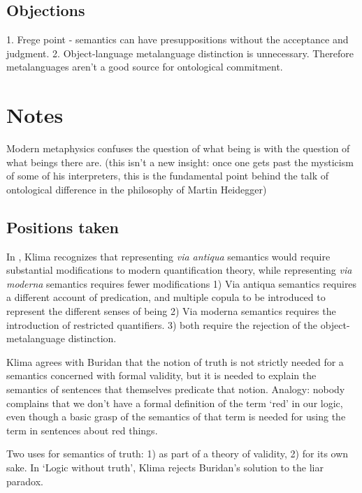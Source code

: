 \documentclass[]{article}
\begin{document}
\subsection{Objections}
1. Frege point - semantics can have presuppositions without the acceptance and judgment. 
2. Object-language metalanguage distinction is unnecessary. Therefore metalanguages aren't a good source for ontological commitment. 
\section{Notes}
Modern metaphysics confuses the question of what being is with the question of what beings there are. (this isn't a new insight: once one gets past the mysticism of some of his interpreters, this is the fundamental point behind the talk of ontological difference in the philosophy of Martin Heidegger)
\subsection{Positions taken}
In \autocite{Klima2008a}, Klima recognizes that representing \emph{via antiqua} semantics would require substantial modifications to modern quantification theory, while representing \emph{via moderna} semantics requires fewer modifications
1) Via antiqua semantics requires a different account of predication, and multiple copula to be introduced to represent the different senses of being
2) Via moderna semantics requires the introduction of restricted quantifiers.
3) both require the rejection of the object-metalanguage distinction.

Klima agrees with Buridan that the notion of truth is not strictly needed for a semantics concerned with formal validity, but it is needed to explain the semantics of sentences that themselves predicate that notion.
Analogy: nobody complains that we don't have a formal definition of the term `red' in our logic, even though a basic grasp of the semantics of that term is needed for using the term in sentences about red things.

Two uses for semantics of truth: 1) as part of a theory of validity, 2) for its own sake.
In `Logic without truth', Klima rejects Buridan's solution to the liar paradox.

\end{document}

